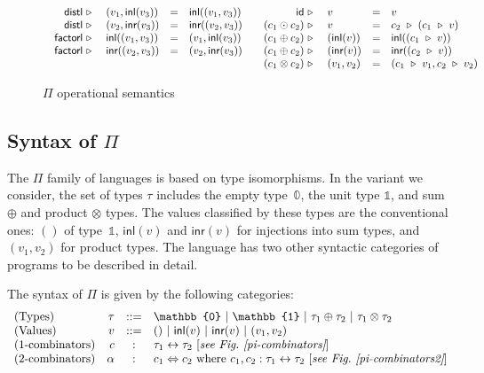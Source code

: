 \documentclass[a4paper,USenglish]{lipics-v2016-utf8x}
\newcommand{\iso}{\leftrightarrow}
\newcommand{\isotwo}{\Leftrightarrow}
\newcommand{\alt}{~|~}
\newcommand{\inl}[1]{\textsf{inl}(#1)}
\newcommand{\inr}[1]{\textsf{inr}(#1)}
\newcommand{\zt}{\mathbb{0}}
\newcommand{\ot}{\mathbb{1}}
\newcommand{\evalone}[2]{#1~\triangleright~#2}
\newcommand{\unitv}{()}
\newcommand{\distl}{\mathsf{{distl}}}
\newcommand{\factorl}{\mathsf{{factorl}}}
\newcommand{\idiso}{\mathsf{{id}}}
\begin{document}
\begin{figure}[t]
{\[\begin{array}{cc}
\begin{array}[t]{rlcl}
\evalone{\distl}{&(v_1,\inl{v_3})} &=& \inl{(v_1,v_3)} \\
\evalone{\distl}{&(v_2,\inr{v_3})} &=& \inr{(v_2,v_3)} \\
\evalone{\factorl}{&\inl{(v_1,v_3)}} &=& (v_1,\inl{v_3}) \\
\evalone{\factorl}{&\inr{(v_2,v_3)}} &=& (v_2,\inr{v_3})
\end{array} &
\begin{array}[t]{rlcl}
\evalone{\idiso}{&v} &=& v \\
\evalone{(c_1 \odot c_2)}{&v} &=&
  \evalone{c_2}{(\evalone{c_1}{v})} \\
\evalone{(c_1 \oplus c_2)}{&(\inl{v})} &=&
  \inl{(\evalone{c_1}{v})} \\
\evalone{(c_1 \oplus c_2)}{&(\inr{v})} &=&
  \inr{(\evalone{c_2}{v})} \\
\evalone{(c_1 \otimes c_2)}{&(v_1,v_2)} &=&
  (\evalone{c_1}v_1, \evalone{c_2}v_2)
\end{array}
\end{array}\]
\caption{\label{opsem}$\Pi$ operational semantics}
}
\end{figure}

\subsection{Syntax of $\Pi$}
\label{opsempi}

The $\Pi$ family of languages is based on type isomorphisms. In the
variant we consider, the set of types $\tau$ includes the empty
type~$\zt$, the unit type $\ot$, and sum $\oplus$ and product
$\otimes$ types. The values classified by these types are the
conventional ones: $\unitv$ of type~$\ot$, $\inl{v}$ and $\inr{v}$ for
injections into sum types, and $(v_1,v_2)$ for product types. The
language has two other syntactic categories of programs to be
described in detail.

\begin{definition}[$\Pi$]
\label{def:pi}
The syntax of $\Pi$ is given by the following categories:
\[\begin{array}{lrcl}
(\textrm{Types}) &
  \tau &::=& \zt \alt \ot \alt \tau_1 \oplus \tau_2 \alt \tau_1 \otimes \tau_2 \\
(\textrm{Values}) &
  v &::=& \unitv \alt \inl{v} \alt \inr{v} \alt (v_1,v_2) \\
(\textrm{1-combinators}) &
  c &:& \tau_1 \iso \tau_2 ~ [\textit{see Fig.~\ref{pi-combinators}}] \\
(\textrm{2-combinators}) &
  \alpha &:& c_1 \isotwo c_2 \mbox{~where~} c_1, c_2 : \tau_1 \iso \tau_2
  ~[\textit{see Fig.~\ref{pi-combinators2}}]
\end{array}\]
\end{definition}
\end{document}
